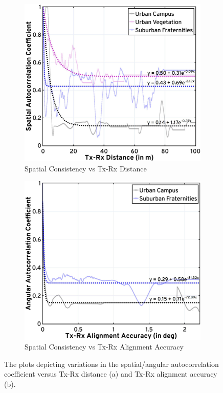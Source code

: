 \documentclass[10pt, twocolumn]{IEEEtran}
\begin{document}
\begin{figure} [t]
     \centering
     \begin{subfigure}{0.496\linewidth}
         \centering
         \includegraphics[width=0.84\linewidth]{figs/sc_distance_updated.jpg}
         \vspace{-1mm}
         \caption{Spatial Consistency vs Tx-Rx Distance}
         \label{F7a}
     \end{subfigure}
     \begin{subfigure}{0.496\linewidth}
         \centering
         \includegraphics[width=0.83\linewidth]{figs/sc_alignment_updated.jpg}
         \vspace{-1mm}
         \caption{Spatial Consistency vs Tx-Rx Alignment Accuracy}
         \label{F7b}
     \end{subfigure}
     \vspace{-2mm}
     \caption{The plots depicting variations in the spatial/angular autocorrelation coefficient versus Tx-Rx distance (a) and Tx-Rx alignment accuracy (b).}
     \label{F7}
     \vspace{-6mm}
\end{figure}
\vspace{-9mm}
\end{document}
